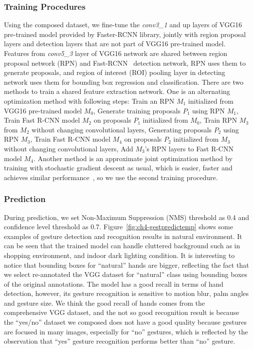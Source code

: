 \subsubsection{Training Procedures}
Using the composed dataset, we fine-tune the \emph{conv3\_1} and up layers of VGG16 pre-trained model provided by Faster-RCNN library, jointly with region proposal layers and detection layers that are not part of VGG16 pre-trained model. Features from \emph{conv5\_3} layer of VGG16 network are shared between region proposal network (RPN) and Fast-RCNN~\cite{girshick2015fast} detection network, RPN uses them to generate proposals, and region of interest (ROI) pooling layer in detecting network uses them for bounding box regression and classification. There are two methods to train a shared feature extraction network. One is an alternating optimization method with following steps:  Train an RPN $M_1$ initialized from VGG16 pre-trained model $M_0$,  Generate training proposals $P_1$ using RPN $M_1$,  Train Fast R-CNN model $M_2$ on proposals $P_1$ initialized from $M_0$,  Train RPN $M_3$ from $M_2$ without changing convolutional layers,  Generating proposals $P_2$ using RPN $M_3$,  Train Fast R-CNN model $M_4$ on proposals $P_2$ initialized from $M_3$ without changing convolutional layers,  Add $M_3$'s RPN layers to Fast R-CNN model $M_4$. Another method is an approximate joint optimization method by training with stochastic gradient descent as usual, which is easier, faster and achieves similar performance~\cite{links:pyfasterrcnn}, so we use the second training procedure.

\subsubsection{Prediction}
During prediction, we set Non-Maximum Suppression (NMS) threshold as 0.4 and confidence level threshold as 0.7. Figure~\ref{fig:ch4-gestpredictemp} shows some examples of gesture detection and recognition results in natural environment. It can be seen that the trained model can handle cluttered background such as in shopping environment, and indoor dark lighting condition. It is interesting to notice that bounding boxes for ``natural'' hands are bigger, reflecting the fact that we select re-annotated the VGG dataset for ``natural'' class using bounding boxes of the original annotations. The model has a good recall in terms of hand detection, however, its gesture recognition is sensitive to motion blur, palm angles and gesture size. We think the good recall of hands comes from the comprehensive VGG dataset, and the not so good recognition result is because the ``yes/no'' dataset we composed does not have a good quality because gestures are focused in many images, especially for ``no'' gestures, which is reflected by the observation that ``yes'' gesture recognition performs better than ``no'' gesture.

